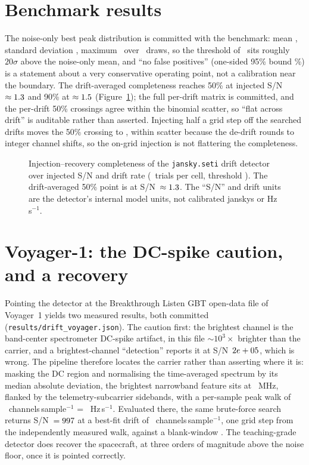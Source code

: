 \documentclass[twocolumn]{aastex631}
\newcommand{\code}[1]{\texttt{#1}}
\begin{document}
\section{Benchmark results}
The noise-only best peak distribution is committed with the benchmark: mean \dsNoiseMean, standard
deviation \dsNoiseSd, maximum \dsNoiseMax\ over \dsFprTrials\ draws, so the threshold of \dsThreshold\ sits roughly $20\sigma$ above the noise-only mean, and ``no false positives''
(one-sided 95\% bound \dsFprBound\%) is a statement about a very conservative operating point,
not a calibration near the boundary. The drift-averaged completeness reaches 50\% at injected
S/N~$\approx1.3$ and 90\% at $\approx1.5$ (Figure~\ref{fig:recovery}); the full
per-drift matrix is committed, and the per-drift 50\% crossings agree within the binomial
scatter, so ``flat across drift'' is auditable rather than asserted. Injecting half a grid step
off the searched drifts moves the 50\% crossing to \dsOffGridCfifty, within scatter because the de-drift rounds to integer channel shifts, so the on-grid injection is not flattering the
completeness.

\begin{figure}
\caption{Injection--recovery completeness of the \code{jansky.seti} drift detector over injected S/N
and drift rate (\dsNtrials\ trials per cell, threshold \dsThreshold). The drift-averaged 50\% point is
at S/N~$\approx1.3$. The ``S/N'' and drift units are the detector's internal model units, not
calibrated janskys or Hz\,s$^{-1}$.}
\label{fig:recovery}
\end{figure}

\section{Voyager-1: the DC-spike caution, and a recovery}
Pointing the detector at the Breakthrough Listen GBT open-data file of Voyager~1
\citep{lebofsky2019, macmahon2018} yields two measured results, both committed
(\code{results/drift\_voyager.json}). The caution first: the brightest channel is the band-center spectrometer DC-spike artifact, in this file $\sim10^{3}\times$ brighter than the carrier, and a brightest-channel ``detection'' reports it at S/N~$2e+05$, which is wrong. The
pipeline therefore locates the carrier rather than asserting where it is: masking the DC
region and normalising the time-averaged spectrum by its median absolute deviation, the brightest
narrowband feature sits at \dsVoyFreq~MHz, flanked by the telemetry-subcarrier sidebands, with a
per-sample peak walk of \dsVoyDriftChan\ channels\,sample$^{-1}$ = \dsVoyDriftHz~Hz\,s$^{-1}$.
Evaluated there, the same brute-force search returns S/N~$=997$ at a best-fit drift of \dsVoyBestDrift\ channels\,sample$^{-1}$, one grid step from the independently measured walk, against a blank-window \dsVoyBlankSnr. The teaching-grade detector does recover the
spacecraft, at three orders of magnitude above the noise floor, once it is pointed correctly.
\end{document}
